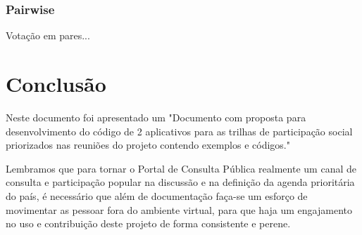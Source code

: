 \documentclass[12pt]{article}
\newcommand{\ProductDescription}{"Documento com proposta para desenvolvimento
        do código de 2 aplicativos para as trilhas de participação social
        priorizados nas reuniões do projeto contendo exemplos e códigos."
}
\begin{document}
\subsubsection{Pairwise}

Votação em pares...

\section{Conclusão}

Neste documento foi apresentado um \ProductDescription

Lembramos que para tornar o Portal de Consulta Pública realmente um canal de
consulta e participação popular na discussão e na definição da agenda
prioritária do país, é necessário que além de documentação faça-se um esforço
de movimentar as pessoar fora do ambiente virtual, para que haja um
engajamento no uso e contribuição deste projeto de forma consistente e perene.

\newpage

\newpage
\listoffigures
\newpage
\printindex
\newpage

%
\end{document}
